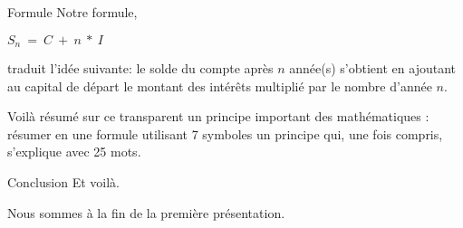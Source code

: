 \documentclass{beamer}
\begin{document}
\begin{frame}{Formule}
  Notre formule,
  \begin{center}
    \begin{math}
    S_{n}\ =\ C\ +\ n\ *\ I
    \end{math}
  \end{center}
  
  traduit l'idée suivante: le solde du compte après $n$ année(s) s'obtient en ajoutant au capital de départ le montant des intérêts multiplié par le nombre d'année $n$.
  
  Voilà résumé sur ce transparent un principe important des mathématiques : résumer en une formule utilisant 7 symboles un principe qui, une fois compris, s'explique avec 25 mots.
\end{frame}

\begin{frame}{Conclusion}
  Et voilà.
  
  Nous sommes à la fin de la première présentation.
\end{frame}
\end{document}
